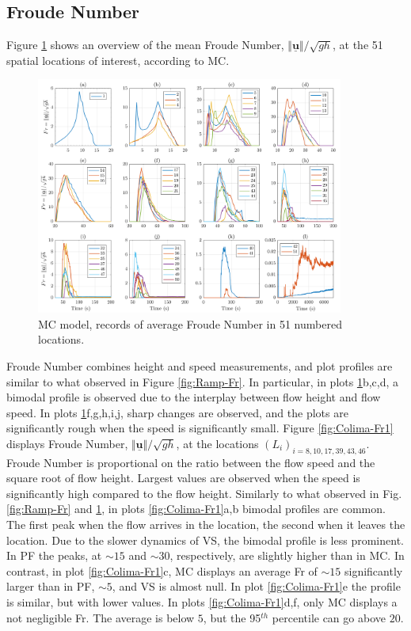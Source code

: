 \documentclass{article}
\begin{document}
\subsection{Froude Number}
Figure \ref{fig:BAF-Fr-MC} shows an overview of the mean Froude Number, $\Vert \underline{\mathbf{u}} \Vert/\sqrt{gh}$, at the 51 spatial locations of interest, according to MC.
\begin{figure}[H]
         \centering
        \includegraphics[width=0.9\textwidth]{ancFigs/Colima/FroudeMC_BAF.png}
        \caption{MC model, records of average Froude Number in 51 numbered locations.}
        \label{fig:BAF-Fr-MC}
\end{figure}
Froude Number combines height and speed measurements, and plot profiles are similar to what observed in Figure \ref{fig:Ramp-Fr}. In particular, in plots \ref{fig:BAF-Fr-MC}b,c,d, a bimodal profile is observed due to the interplay between flow height and flow speed. In plots \ref{fig:BAF-Fr-MC}f,g,h,i,j, sharp changes are observed, and the plots are significantly rough when the speed is significantly small.
\newpage
Figure \ref{fig:Colima-Fr1} displays Froude Number, $\Vert \underline{\mathbf{u}} \Vert/\sqrt{gh}$, at the locations $(L_i)_{i=8,10,17,39,43,46}$. Froude Number is proportional on the ratio between the flow speed and the square root of flow height. Largest values are observed when the speed is significantly high compared to the flow height. Similarly to what observed in Fig. \ref{fig:Ramp-Fr} and \ref{fig:BAF-Fr-MC}, in plots \ref{fig:Colima-Fr1}a,b bimodal profiles are common. The first peak when the flow arrives in the location, the second when it leaves the location. Due to the slower dynamics of VS, the bimodal profile is less prominent. In PF the peaks, at $\sim 15$ and $\sim 30$, respectively, are slightly higher than in MC. In contrast, in plot \ref{fig:Colima-Fr1}c, MC displays an average Fr of $\sim 15$ significantly larger than in PF, $\sim 5$, and VS is almost null. In plot \ref{fig:Colima-Fr1}e the profile is similar, but with lower values. In plots \ref{fig:Colima-Fr1}d,f, only MC displays a not negligible Fr. The average is below $5$, but the 95$^{th}$ percentile can go above $20$.
\end{document}
